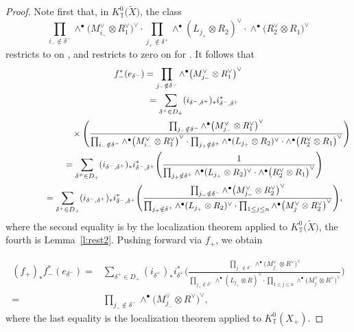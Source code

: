 \documentclass[pdftex]{sigma}
\numberwithin{equation}{section}
\newcommand{\torus}{\mathbb{T}}
\newcommand{\MB}{M}
\newcommand{\LB}{L}
\begin{document}
\begin{proof}
Note first that,
in $K^0_\torus\bigl(\tilde X\bigr)$, the class
\[
\prod_{ i_{-} \notin \delta^-} \wedge^\bullet \bigl(\MB_{i_{-}}^\vee \otimes R_1^\vee\bigr)^\vee \cdot \prod_{j_{+} \notin \delta^+} \wedge^\bullet ( \LB_{j_+} \otimes R_2)^\vee \cdot \wedge^\bullet \bigl(R_2^\vee \otimes R_1\bigr)^\vee
\]
restricts to  on
, and restricts to zero on  for .
It follows that
\begin{gather*}
f_{-}^*(e_{\delta^-}) = \prod_{j_- \notin \delta^-} \wedge^\bullet \bigl(\MB_{j_-}^\vee \otimes R_1^\vee\bigr)^\vee \\
\hphantom{f_{-}^*(e_{\delta^-})}{}
= \sum_{\delta^+ \in D_{+}} (i_{\delta^-, \delta^+})_*i_{\delta^-, \delta^+}^* \\
\hphantom{f_{-}^*(e_{\delta^-}) =\sum_{\delta^+ \in D_{+}}}{}
 \times\Biggl(\frac{\prod_{j_- \notin \delta^-} \wedge^\bullet \bigl(\MB_{j_-}^\vee \otimes R_1^\vee\bigr)^\vee}
{ \prod_{ i_{-} \notin \delta^-} \wedge^\bullet \bigl(\MB_{i_{-}}^\vee \otimes R_1^\vee\bigr)^\vee \cdot \prod_{j_{+} \notin \delta^+} \wedge^\bullet ( \LB_{j_+} \otimes R_2)^\vee \cdot \wedge^\bullet \bigl(R_2^\vee \otimes R_1\bigr)^\vee}\Biggr)
\\
\hphantom{f_{-}^*(e_{\delta^-})}{}
= \sum_{\delta^+ \in D_{+}} (i_{\delta^-, \delta^+})_*i_{\delta^-, \delta^+}^* \Biggl(\frac{1}
{ \prod_{j_{+} \notin \delta^+} \wedge^\bullet ( \LB_{j_+} \otimes R_2)^\vee \cdot \wedge^\bullet \bigl(R_2^\vee \otimes R_1\bigr)^\vee}\Biggr)
\\
\hphantom{f_{-}^*(e_{\delta^-})}{}
= \sum_{\delta^+ \in D_{+}} (i_{\delta^-, \delta^+})_*i_{\delta^-, \delta^+}^* \Biggl(\frac{\prod_{j_- \notin \delta^-} \wedge^\bullet \bigl(\MB_{j_-}^\vee \otimes R_2^\vee\bigr)^\vee }
{ \prod_{j_{+} \notin \delta^+} \wedge^\bullet ( \LB_{j_+} \otimes R_2)^\vee \cdot \prod_{1 \leq j \leq n} \wedge^\bullet \bigl(\MB_{j}^\vee \otimes R_2^\vee\bigr)^\vee }\Biggr),
\end{gather*}
where the second equality is by the localization theorem applied to $K^0_\torus\bigl(\tilde X\bigr)$, the fourth is Lemma~\ref{l:rest2}.
Pushing forward via $f_{+}$, we obtain

\begin{align*}
(f_{+})_* f_{-}^*(e_{\delta^-})
={}& \sum_{\delta^+ \in D_{+}} (i_{\delta^+})_*i_{\delta^+}^* \Biggl(\frac{\prod_{j_- \notin \delta^-} \wedge^\bullet \bigl(\MB_{j_-}^\vee \otimes R^\vee\bigr)^\vee }
{ \prod_{j_{+} \notin \delta^+} \wedge^\bullet ( \LB_{j_+} \otimes R)^\vee \cdot \prod_{1 \leq j \leq n} \wedge^\bullet \bigl(\MB_{j}^\vee \otimes R^\vee\bigr)^\vee }\Biggr) \\
={}& \prod_{j_- \notin \delta^-} \wedge^\bullet \bigl(\MB_{j_-}^\vee \otimes R^\vee\bigr)^\vee,
\end{align*}
where the last equality is the localization theorem applied to $K^0_\torus(X_{+})$.
\end{proof}
\end{document}
